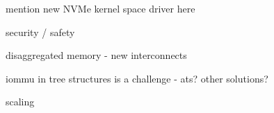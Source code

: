 mention new NVMe kernel space driver here

security / safety

disaggregated memory - new interconnects

iommu in tree structures is a challenge - ats? other solutions?


scaling 



%
%

